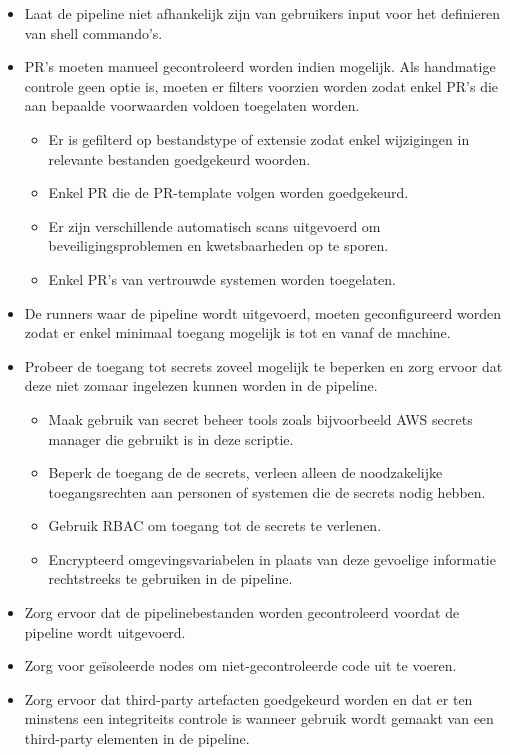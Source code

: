 \begin{itemize}
  \item Laat de pipeline niet afhankelijk zijn van gebruikers input voor het definieren van shell commando's.
  \item PR's moeten manueel gecontroleerd worden indien mogelijk. Als handmatige controle geen optie is, moeten er filters voorzien worden zodat enkel PR's die aan bepaalde voorwaarden voldoen toegelaten worden.
  \begin{itemize}
    \item Er is gefilterd op bestandstype of extensie zodat enkel wijzigingen in relevante bestanden goedgekeurd woorden.
    \item Enkel PR die de PR-template volgen worden goedgekeurd.
    \item Er zijn verschillende automatisch scans uitgevoerd om beveiligingsproblemen en kwetsbaarheden op te sporen.
    \item Enkel PR's van vertrouwde systemen worden toegelaten.
  \end{itemize}
  \item De runners waar de pipeline wordt uitgevoerd, moeten geconfigureerd worden zodat er enkel minimaal toegang mogelijk is tot en vanaf de machine.
  \item Probeer de toegang tot secrets zoveel mogelijk te beperken en zorg ervoor dat deze niet zomaar ingelezen kunnen worden in de pipeline.
  \begin{itemize}
    \item Maak gebruik van secret beheer tools zoals bijvoorbeeld AWS secrets manager die gebruikt is in deze scriptie.
    \item Beperk de toegang de de secrets, verleen alleen de noodzakelijke toegangsrechten aan personen of systemen die de secrets nodig hebben.
    \item Gebruik RBAC om toegang tot de secrets te verlenen.
    \item Encrypteerd omgevingsvariabelen in plaats van deze gevoelige informatie rechtstreeks te gebruiken in de pipeline.
  \end{itemize}
  \item Zorg ervoor dat de pipelinebestanden worden gecontroleerd voordat de pipeline wordt uitgevoerd.
  \item Zorg voor geïsoleerde nodes om niet-gecontroleerde code uit te voeren.
  \item Zorg ervoor dat third-party artefacten goedgekeurd worden en dat er ten minstens een integriteits controle is wanneer gebruik wordt gemaakt van een third-party elementen in de pipeline.
\end{itemize}

